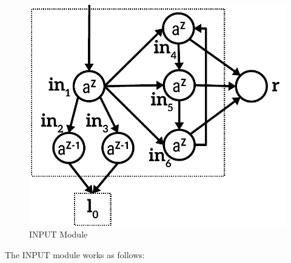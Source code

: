 \documentclass[runningheads,a4paper]{llncs}
\begin{document}
\begin{figure}
\begin{center}
\includegraphics[scale=0.50]{figures/input-module-2.pdf}
\caption{INPUT Module}
\label{fig-input}
\end{center}
\end{figure}   

The INPUT module works as follows:
\end{document}
